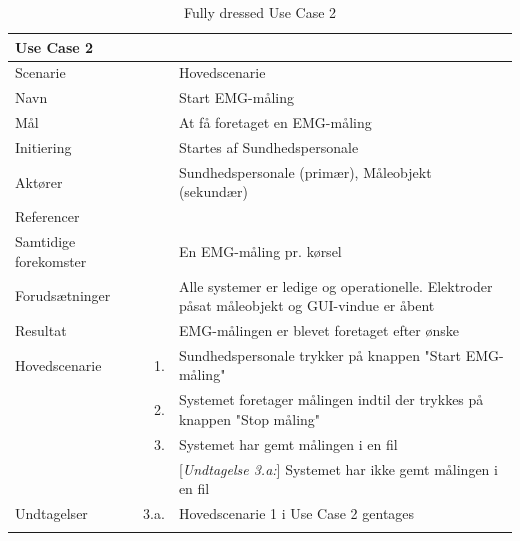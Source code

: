 \begin{longtabu} to  %
	{\large \textbf{Use Case 2}} && \\
	\toprule
	Scenarie 				&&	Hovedscenarie\\
	Navn 					&& 	Start EMG-måling\\
	Mål 					&& 	At få foretaget en EMG-måling\\
	Initiering 				&& 	Startes af Sundhedspersonale\\
	Aktører 				&& 	Sundhedspersonale (primær), Måleobjekt (sekundær)\\
	Referencer 				&& 	\\
	Samtidige forekomster  	&& 	En EMG-måling pr. kørsel \\
	Forudsætninger 			&&	Alle systemer er ledige og operationelle. Elektroder påsat måleobjekt og GUI-vindue er åbent\\ 
	Resultat 				&& 	EMG-målingen er blevet foretaget efter ønske\\ \midrule
	Hovedscenarie 			&    1. 	&	Sundhedspersonale trykker på knappen "Start EMG-måling"\\ 				 	
							&    2. 	& 	Systemet foretager målingen indtil der trykkes på knappen "Stop måling" \\[-1ex]
							& 	 3.		&	 Systemet har gemt målingen i en fil \\[-1ex]
                            &&[\textit{Undtagelse 3.a:}] Systemet har ikke gemt målingen i en fil\\ \midrule
	Undtagelser 			& 3.a. & Hovedscenarie 1 i Use Case 2 gentages\\ \bottomrule
	\caption{Fully dressed Use Case 2}
	\label{UC2}
\end{longtabu}

